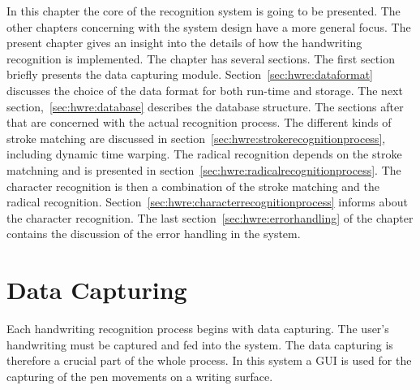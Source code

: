 In this chapter the core of the recognition system is going to be presented.
The other chapters concerning with the system design have a more general focus.
The present chapter gives an insight into the details of how the handwriting
recognition is implemented. The chapter has several sections. The first section
briefly presents the data capturing module. Section~\ref{sec:hwre:dataformat}
discusses the choice of the data format for both run-time and storage.
The next section,~\ref{sec:hwre:database} describes the database structure.
The sections after that are concerned with the actual recognition process.
The different kinds of stroke matching are discussed in 
section~\ref{sec:hwre:strokerecognitionprocess}, including dynamic time warping.
The radical recognition depends on the stroke matchning and is presented in
section~\ref{sec:hwre:radicalrecognitionprocess}.
The character recognition is then a combination of the stroke matching and
the radical recognition. Section~\ref{sec:hwre:characterrecognitionprocess}
informs about the character recognition.
The last section~\ref{sec:hwre:errorhandling} of the chapter contains the 
discussion of the error handling in the system.

\section{Data Capturing}
\label{sec:hwre:datacapturing}

Each handwriting recognition process begins with data capturing.
The user's handwriting must be captured and fed into the system. The data 
capturing is therefore a crucial part of the whole process. In this system 
a GUI is used for the capturing of the pen movements on a writing surface.


